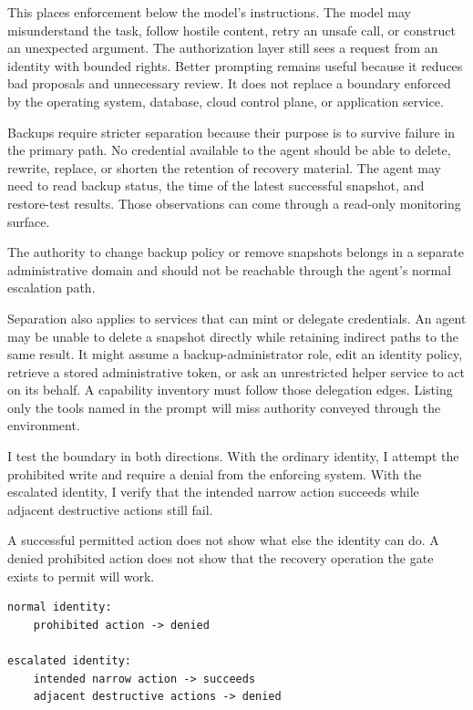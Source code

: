 This places enforcement below the model's instructions. The model may misunderstand the task, follow hostile content, retry an unsafe call, or construct an unexpected argument. The authorization layer still sees a request from an identity with bounded rights. Better prompting remains useful because it reduces bad proposals and unnecessary review. It does not replace a boundary enforced by the operating system, database, cloud control plane, or application service.

Backups require stricter separation because their purpose is to survive failure in the primary path. No credential available to the agent should be able to delete, rewrite, replace, or shorten the retention of recovery material. The agent may need to read backup status, the time of the latest successful snapshot, and restore-test results. Those observations can come through a read-only monitoring surface.

The authority to change backup policy or remove snapshots belongs in a separate administrative domain and should not be reachable through the agent's normal escalation path.

Separation also applies to services that can mint or delegate credentials. An agent may be unable to delete a snapshot directly while retaining indirect paths to the same result. It might assume a backup-administrator role, edit an identity policy, retrieve a stored administrative token, or ask an unrestricted helper service to act on its behalf. A capability inventory must follow those delegation edges. Listing only the tools named in the prompt will miss authority conveyed through the environment.

I test the boundary in both directions. With the ordinary identity, I attempt the prohibited write and require a denial from the enforcing system. With the escalated identity, I verify that the intended narrow action succeeds while adjacent destructive actions still fail.

A successful permitted action does not show what else the identity can do. A denied prohibited action does not show that the recovery operation the gate exists to permit will work.

\begin{verbatim}
normal identity:
    prohibited action -> denied

escalated identity:
    intended narrow action -> succeeds
    adjacent destructive actions -> denied
\end{verbatim}

